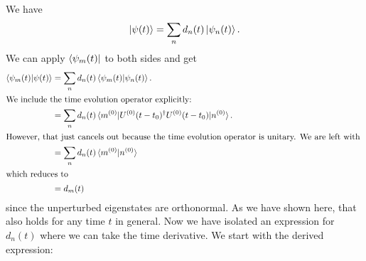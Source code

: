 \documentclass[11pt, english, fleqn, DIV=15, headinclude, BCOR=1.5cm]{scrartcl}
\begin{document}
We have
\[
    \ket{\psi(t)} = \sum_n d_n(t) \ket{\psi_n(t)}.
\]
We can apply $\bra{\psi_m(t)}$ to both sides and get
\begin{align*}
    \braket{\psi_m(t) | \psi(t)}
    &= \sum_n d_n(t) \braket{\psi_m(t) | \psi_n(t)}. \\
    \intertext{%
        We include the time evolution operator explicitly:
    }
    &= \sum_n d_n(t) \braket{m\0 | U\0(t-t_0)^\dagger U\0(t-t_0) | n\0}. \\
    \intertext{%
        However, that just cancels out because the time evolution operator is
        unitary. We are left with
    }
    &= \sum_n d_n(t) \braket{m\0 | n\0} \\
    \intertext{%
        which reduces to
    }
    &= d_m(t)
\end{align*}
since the unperturbed eigenstates are orthonormal. As we have shown here, that
also holds for any time $t$ in general. Now we have isolated an expression for
$d_n(t)$ where we can take the time derivative. We start with the derived
expression:
\end{document}
